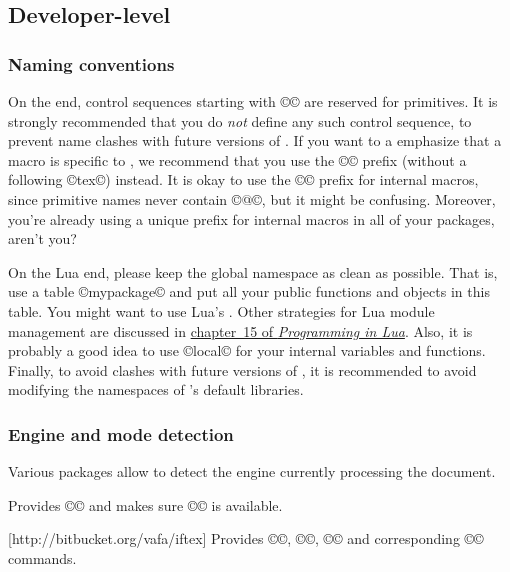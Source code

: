 \documentclass{lltxdoc}
\begin{document}
\subsection{Developer-level}

\subsubsection{Naming conventions}

On the \tex end, control sequences starting with ©\luatex© are reserved for
primitives. It is strongly recommended that you do \emph{not} define any such
control sequence, to prevent name clashes with future versions of \luatex. If
you want to a emphasize that a macro is specific to \luatex, we recommend that
you use the ©\lua© prefix (without a following ©tex©) instead. It is okay to
use the ©\luatex@© prefix for internal macros, since primitive names never
contain ©@©, but it might be confusing. Moreover, you're already using a
unique prefix for internal macros in all of your packages, aren't you?

On the Lua end, please keep the global namespace as clean as possible. That
is, use a table ©mypackage© and put all your public functions and objects in
this table. You might want to use Lua's
\href{http://www.lua.org/manual/5.1/manual.html#pdf-module} {}.
Other strategies for Lua module management are discussed in
\href{http://www.lua.org/pil/15.html} {chapter~15 of \emph{Programming in
    Lua}}.  Also, it is probably a good idea to use ©local© for your internal
variables and functions. Finally, to avoid clashes with future versions of
\luatex, it is recommended to avoid modifying the namespaces of \luatex's
default libraries.

\subsubsection{Engine and mode detection}\label{detect}

Various packages allow to detect the engine currently processing the document.

Provides ©\ifluatex© and makes sure ©\luatexversion© is available.

[http://bitbucket.org/vafa/iftex]
Provides ©\ifPDFTeX©, ©\ifXeTeX©, ©\ifLuaTeX© and corresponding ©\Require©
commands.
\end{document}

